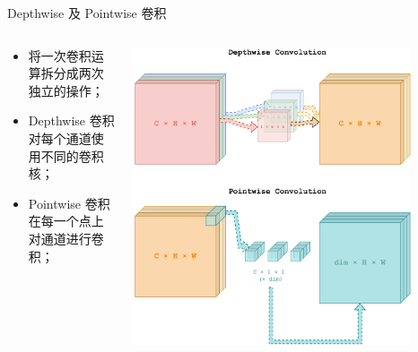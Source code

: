\documentclass[9pt, aspectratio=1610]{beamer}
\begin{document}
    \begin{frame}{Depthwise 及 Pointwise 卷积}
    \begin{columns}
        \begin{column}{0.5\textwidth}
            \begin{itemize}
                \item 将一次卷积运算拆分成两次独立的操作；
                \item Depthwise 卷积对每个通道使用不同的卷积核；
                \item Pointwise 卷积在每一个点上对通道进行卷积；
            \end{itemize}
        \end{column}
        \begin{column}{0.5\textwidth}
            \begin{center}
                \includegraphics[width=0.85\textwidth]{depth_point_wise_conv.pdf}
            \end{center}
        \end{column}
    \end{columns}
        
    \end{frame}
\end{document}
